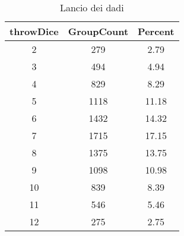 \begin{table}[h]%
\centering%
\begin{tabular}{ccc}%
\toprule%
\textbf{throwDice}&\textbf{GroupCount}&\textbf{Percent}\\
\hline%
2 & 279 & 2.79 \\ 
3 & 494 & 4.94 \\ 
4 & 829 & 8.29 \\ 
5 & 1118 & 11.18 \\ 
6 & 1432 & 14.32 \\ 
7 & 1715 & 17.15 \\ 
8 & 1375 & 13.75 \\ 
9 & 1098 & 10.98 \\ 
10 & 839 & 8.39 \\ 
11 & 546 & 5.46 \\ 
12 & 275 & 2.75 \\ 
\hline%
\end{tabular}%
\caption{Lancio dei dadi}%
\label{tab:Lancio_dei_dadi}%
\end{table}%